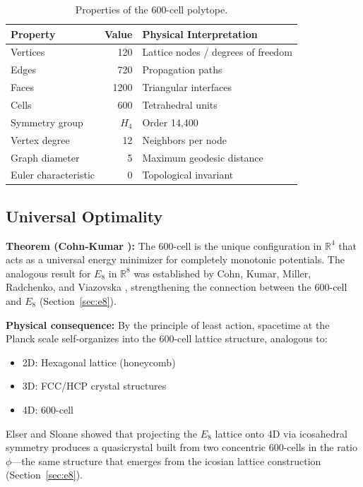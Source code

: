 \documentclass[12pt,a4paper]{article}
\begin{document}
\begin{table}[H]
\centering
\begin{tabular}{lrl}
\toprule
\textbf{Property} & \textbf{Value} & \textbf{Physical Interpretation} \\
\midrule
Vertices & 120 & Lattice nodes / degrees of freedom \\
Edges & 720 & Propagation paths \\
Faces & 1200 & Triangular interfaces \\
Cells & 600 & Tetrahedral units \\
Symmetry group & $H_4$ & Order 14,400 \\
Vertex degree & 12 & Neighbors per node \\
Graph diameter & 5 & Maximum geodesic distance \\
Euler characteristic & 0 & Topological invariant \\
\bottomrule
\end{tabular}
\caption{Properties of the 600-cell polytope.}
\end{table}

\subsection{Universal Optimality}

\textbf{Theorem (Cohn-Kumar \cite{cohn2007}):} The 600-cell is the unique configuration in $\mathbb{R}^4$ that acts as a universal energy minimizer for completely monotonic potentials. The analogous result for $E_8$ in $\mathbb{R}^8$ was established by Cohn, Kumar, Miller, Radchenko, and Viazovska \cite{cohn2022}, strengthening the connection between the 600-cell and $E_8$ (Section~\ref{sec:e8}).

\textbf{Physical consequence:} By the principle of least action, spacetime at the Planck scale self-organizes into the 600-cell lattice structure, analogous to:
\begin{itemize}
    \item 2D: Hexagonal lattice (honeycomb)
    \item 3D: FCC/HCP crystal structures
    \item 4D: 600-cell
\end{itemize}

Elser and Sloane \cite{elser1987} showed that projecting the $E_8$ lattice onto 4D via icosahedral symmetry produces a quasicrystal built from two concentric 600-cells in the ratio $\phi$---the same structure that emerges from the icosian lattice construction (Section~\ref{sec:e8}).
\end{document}
